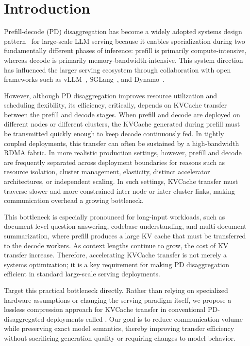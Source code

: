 \section{Introduction}
\label{sec:intro}
Prefill-decode (PD) disaggregation has become a widely adopted systems design pattern~\cite{zhong2024distserve,jia2025disaggregated} for large-scale LLM serving because it enables specialization during two fundamentally different phases of inference: prefill is primarily compute-intensive, whereas decode is primarily memory-bandwidth-intensive. This system direction has influenced the larger serving ecosystem through collaboration with open frameworks such as vLLM~\cite{vllm2025}, SGLang~\cite{sglang2025}, and Dynamo~\cite{dynamo2025}.

However, although PD disaggregation improves resource utilization and scheduling flexibility, its efficiency, critically, depends on KVCache transfer between the prefill and decode stages. When prefill and decode are deployed on different nodes or different clusters, the KVCache generated during prefill must be transmitted quickly enough to keep decode continuously fed. In tightly coupled deployments, this transfer can often be sustained by a high-bandwidth RDMA fabric. In more realistic production settings, however, prefill and decode are frequently separated across deployment boundaries for reasons such as resource isolation, cluster management, elasticity, distinct accelerator architectures, or independent scaling. In such settings, KVCache transfer must traverse slower and more constrained inter-node or inter-cluster links, making communication overhead a growing bottleneck.

This bottleneck is especially pronounced for long-input workloads, such as document-level question answering, codebase understanding, and multi-document summarization, where prefill produces a large KV cache that must be transferred to the decode workers. As context lengths continue to grow, the cost of KV transfer increase. Therefore, accelerating KVCache transfer is not merely a systems optimization; it is a key requirement for making PD disaggregation efficient in standard large-scale serving deployments.

Target this practical bottleneck directly. Rather than relying on specialized hardware assumptions or changing the serving paradigm itself, we propose a lossless compression approach for KVCache transfer in conventional PD-disaggregated deployments called \textbf{\splitzip}. Our goal is to reduce communication volume while preserving exact model semantics, thereby improving transfer efficiency without sacrificing generation quality or requiring changes to model behavior. 

